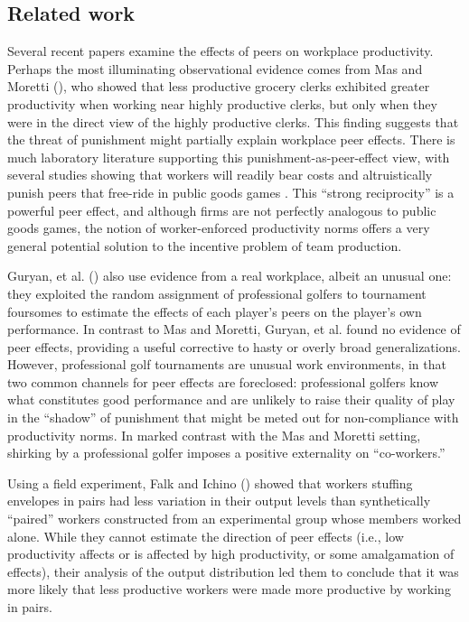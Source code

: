 \documentclass[12pt]{article}
\begin{document}
\subsection{Related work} 
Several recent papers examine the effects of peers on workplace
productivity. Perhaps the most illuminating observational evidence
comes from Mas and Moretti (\citeyear{mas2009peers}), who showed that
less productive grocery clerks exhibited greater productivity when
working near highly productive clerks, but only when they were in the
direct view of the highly productive clerks. This finding suggests
that the threat of punishment might partially explain workplace peer
effects. There is much laboratory literature supporting this
punishment-as-peer-effect view, with several studies showing that
workers will readily bear costs and altruistically punish peers that
free-ride in public goods games \citep{fehr2002altruistic,
  fehr2000cooperation}. This ``strong reciprocity''
\citep{carpenter2009strong} is a powerful peer effect, and although
firms are not perfectly analogous to public goods games, the notion of
worker-enforced productivity norms offers a very general potential
solution to the incentive problem of team production.

Guryan, et al. (\citeyear{guryan2009peer}) also use evidence from a
real workplace, albeit an unusual one: they exploited the random
assignment of professional golfers to tournament foursomes to estimate
the effects of each player's peers on the player's own performance. In
contrast to Mas and Moretti, Guryan, et al. found no evidence of peer
effects, providing a useful corrective to hasty or overly broad
generalizations. However, professional golf tournaments are unusual
work environments, in that two common channels for peer effects are
foreclosed: professional golfers know what constitutes good
performance and are unlikely to raise their quality of play in the
``shadow'' of punishment that might be meted out for non-compliance
with productivity norms. In marked contrast with the Mas and Moretti
setting, shirking by a professional golfer imposes a positive
externality on ``co-workers.''

Using a field experiment, Falk and Ichino (\citeyear{falk2006clean})
showed that workers stuffing envelopes in pairs had less variation in
their output levels than synthetically ``paired'' workers constructed
from an experimental group whose members worked alone. While they
cannot estimate the direction of peer effects (i.e., low productivity
affects or is affected by high productivity, or some amalgamation of
effects), their analysis of the output distribution led them to
conclude that it was more likely that less productive workers were
made more productive by working in pairs.
\end{document}
